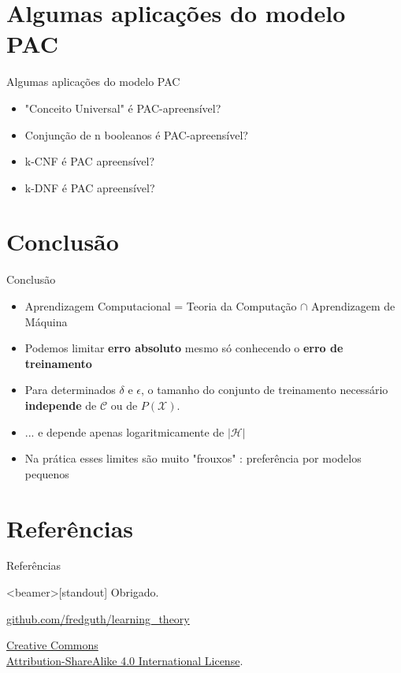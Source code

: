\documentclass[10pt, professionalfonts]{beamer}
\begin{document}
{

  \AtBeginSection{}
\section{Algumas aplicações do modelo PAC}
\begin{frame}{Algumas aplicações do modelo PAC}
  \begin{itemize}[<+->]
    \item "Conceito Universal" é PAC-apreensível?
    \item Conjunção de n booleanos é PAC-apreensível?
    \item k-CNF é PAC apreensível?
    \item k-DNF é PAC apreensível?
    \end{itemize}
\end{frame}
}
{

  \AtBeginSection{}
\section{Conclusão}
\begin{frame}{Conclusão}
  \begin{itemize}[<+->]
    \item Aprendizagem Computacional = Teoria da Computação $\cap$  Aprendizagem de Máquina
    \item Podemos limitar \textbf{erro absoluto} mesmo só conhecendo o \textbf{erro de treinamento}
    \item Para determinados $\delta$ e $\epsilon$, o tamanho do conjunto de treinamento necessário \textbf{independe} de $\mathcal{C}$ ou  de $P(\mathcal{X})$.
    \item ... e depende apenas logaritmicamente de $|\mathcal{H}|$
    \item Na prática esses limites são muito "frouxos" \cite{MitchelPAC}: preferência por modelos pequenos
    \end{itemize}
\end{frame}
}
{

  \AtBeginSection{}
\section{Referências}
\begin{frame}[allowframebreaks]{Referências}

  
  

\end{frame}
}
\begin{frame}<beamer>[standout]
  Obrigado.
  \vspace*{.5cm}
\begin{center}\href{https://github.com/fredguth/learning_theory.git}{\url{github.com/fredguth/learning_theory}}\end{center}
  \vspace*{.5cm}
  \small{
    \begin{center}\ccbysa\end{center}
    \href{http://creativecommons.org/licenses/by-sa/4.0/}{Creative Commons \\
      Attribution-ShareAlike 4.0 International License}.
  }
\end{frame}
\end{document}
